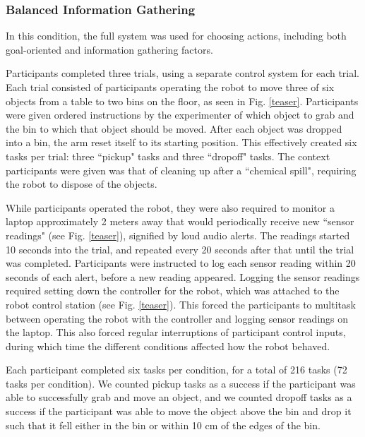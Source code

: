 \documentclass[conference]{IEEEtran}
\begin{document}
\subsubsection{Balanced Information Gathering}
In this condition, the full system was used for choosing actions, including both goal-oriented and information gathering factors.

Participants completed three trials, using a separate control system for each trial. Each trial consisted of participants operating the robot to move three of six objects from a table to two bins on the floor, as seen in Fig. \ref{teaser}. Participants were given ordered instructions by the experimenter of which object to grab and the bin to which that object should be moved. After each object was dropped into a bin, the arm reset itself to its starting position. This effectively created six tasks per trial: three ``pickup" tasks and three ``dropoff" tasks. The context participants were given was that of cleaning up after a ``chemical spill", requiring the robot to dispose of the objects.

While participants operated the robot, they were also required to monitor a laptop approximately 2 meters away that would periodically receive new ``sensor readings" (see Fig. \ref{teaser}), signified by loud audio alerts. The readings started 10 seconds into the trial, and repeated every 20 seconds after that until the trial was completed. Participants were instructed to log each sensor reading within 20 seconds of each alert, before a new reading appeared. Logging the sensor readings required setting down the controller for the robot, which was attached to the robot control station (see Fig. \ref{teaser}). This forced the participants to multitask between operating the robot with the controller and logging sensor readings on the laptop. This also forced regular interruptions of participant control inputs, during which time the different conditions affected how the robot behaved.

Each participant completed six tasks per condition, for a total of 216 tasks (72 tasks per condition). We counted pickup tasks as a success if the participant was able to successfully grab and move an object, and we counted dropoff tasks as a success if the participant was able to move the object above the bin and drop it such that it fell either in the bin or within 10 cm of the edges of the bin.
\end{document}
